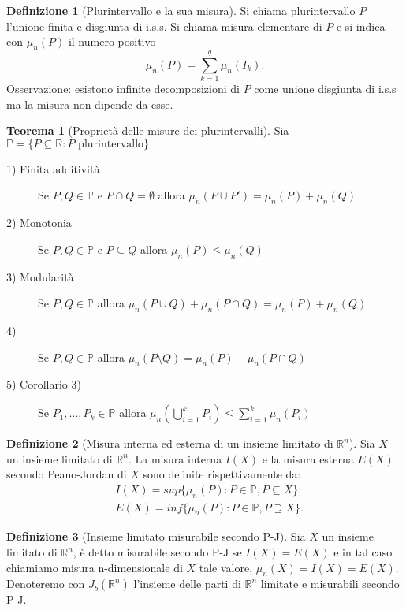 \documentclass[leqno]{article}
\theoremstyle{definition}
\newtheorem{definition}{Definizione}[section]
\numberwithin{equation}{section}
\newtheorem{theorem}{Teorema}[section]
\theoremstyle{remark}
\begin{document}
	\begin{definition}[Plurintervallo e la sua misura]
		Si chiama plurintervallo $P$ l'unione finita e disgiunta di i.s.s. Si chiama misura elementare di $P$ e si indica con $\mu_n(P)$ il numero positivo 
		\[\mu_n(P)=\sum_{k=1}^q\mu_n(I_k).\]
		Osservazione: esistono infinite decomposizioni di $P$ come unione disgiunta di i.s.s ma la misura non dipende da esse.
	\end{definition}
	\begin{theorem}[Proprietà delle misure dei plurintervalli]
		Sia $\mathbb{P}=\{P\subseteq \mathbb{R} : P \text{ plurintervallo}\}$
		\newline 
		\begin{description}
			\item [1) Finita additività] Se $P,Q\in \mathbb{P}$ e $P\cap Q=\emptyset $ allora $\mu_n(P\cup P')=\mu_n(P)+\mu_n(Q)$
			\item [2) Monotonia] Se $P,Q\in \mathbb{P}$ e $P\subseteq Q$ allora $\mu_n(P)\le\mu_n(Q)$
			\item[3) Modularità] Se $P,Q\in \mathbb{P}$ allora $\mu_n(P\cup Q)+\mu_n(P\cap Q)=\mu_n(P)+\mu_n(Q)$
			\item [4)] Se $P,Q\in \mathbb{P}$ allora $\mu_n(P\setminus Q)=\mu_n(P)-\mu_n(P\cap Q)$
			\item [5) Corollario 3) ] Se $P_1,\dots, P_k \in \mathbb{P}$ allora $\mu_n \left(\bigcup_{i=1}^k P_i\right)\le \sum_{i=1}^k \mu_n(P_i) $
		\end{description}
	\end{theorem}
	
	\begin{definition}[Misura interna ed esterna di un insieme limitato di $\mathbb{R}^n$]
		Sia $X$ un insieme limitato di $\mathbb{R}^n$. La misura interna $I(X)$ e la misura esterna $E(X)$ secondo Peano-Jordan di $X$ sono definite rispettivamente da:
		\begin{align*}
			&I(X)=sup\{\mu_n(P): P \in \mathbb{P}, P \subseteq X\}; \\ 
			&E(X)=inf\{\mu_n(P) : P \in \mathbb{P}, P \supseteq X\}. 
		\end{align*}
		
	\end{definition}
	\begin{definition}[Insieme limitato misurabile secondo P-J]
		Sia $X$ un insieme limitato di $\mathbb{R}^n$, è detto misurabile secondo P-J se $I(X)=E(X)$ e in tal caso chiamiamo misura n-dimensionale di $X$ tale valore, $\mu_n(X)=I(X)=E(X)$. Denoteremo con $J_b(\mathbb{R}^n)$ l'insieme delle parti di $\mathbb{R}^n$ limitate e misurabili secondo P-J.
	\end{definition}
	
\end{document}

